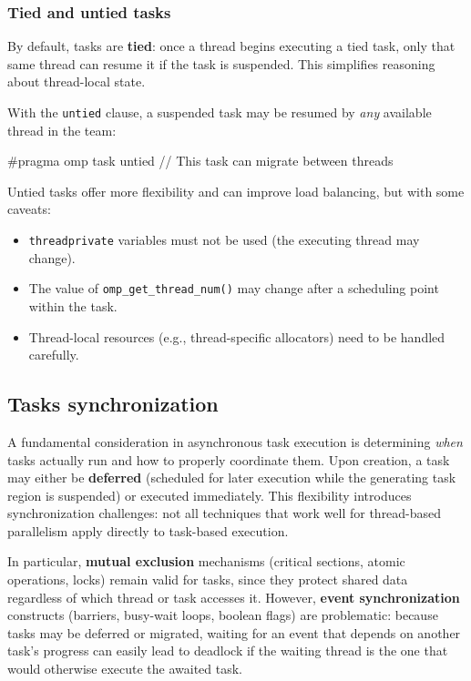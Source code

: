 \subsubsection{Tied and untied tasks}

By default, tasks are \textbf{tied}: once a thread begins executing a tied task, only that same thread can resume it if the task is suspended. This simplifies reasoning about thread-local state.

With the \texttt{untied} clause, a suspended task may be resumed by \textit{any} available thread in the team:

\begin{codeblock}[language=C]
#pragma omp task untied
{ // This task can migrate between threads }
\end{codeblock}

Untied tasks offer more flexibility and can improve load balancing, but with some caveats:
\begin{itemize}[noitemsep]
    \item \texttt{threadprivate} variables must not be used (the executing thread may change).
    \item The value of \texttt{omp\_get\_thread\_num()} may change after a scheduling point within the task.
    \item Thread-local resources (e.g., thread-specific allocators) need to be handled carefully.
\end{itemize}

\subsection{Tasks synchronization}

A fundamental consideration in asynchronous task execution is determining \textit{when} tasks actually run and how to properly coordinate them. Upon creation, a task may either be \textbf{deferred} (scheduled for later execution while the generating task region is suspended) or executed immediately. This flexibility introduces synchronization challenges: not all techniques that work well for thread-based parallelism apply directly to task-based execution.

In particular, \textbf{mutual exclusion} mechanisms (critical sections, atomic operations, locks) remain valid for tasks, since they protect shared data regardless of which thread or task accesses it. However, \textbf{event synchronization} constructs (barriers, busy-wait loops, boolean flags) are problematic: because tasks may be deferred or migrated, waiting for an event that depends on another task's progress can easily lead to deadlock if the waiting thread is the one that would otherwise execute the awaited task.

